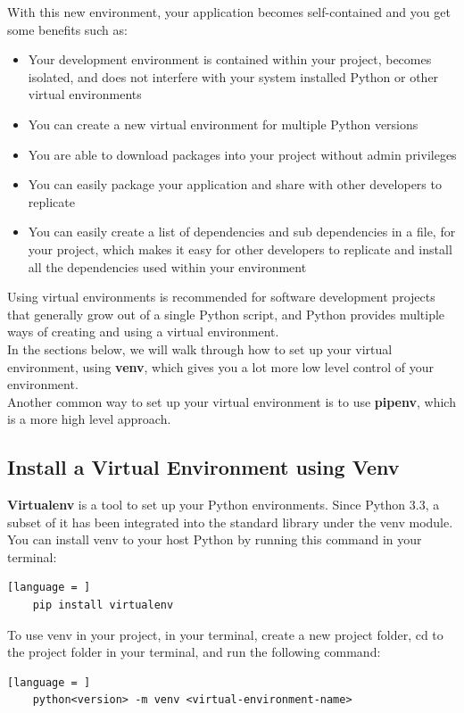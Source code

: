 \documentclass[12pt]{article}
\begin{document}
With this new environment, your application becomes self-contained and you get some benefits such as:
\begin{itemize}
    \item Your development environment is contained within your project, becomes isolated, and does not interfere with your system installed Python or other virtual environments
    \item You can create a new virtual environment for multiple Python versions
    \item You are able to download packages into your project without admin privileges
    \item You can easily package your application and share with other developers to replicate
    \item You can easily create a list of dependencies and sub dependencies in a file, for your project, which makes it easy for other developers to replicate and install all the dependencies used within your environment
\end{itemize}
Using virtual environments is recommended for software development projects that generally grow out of a single Python script, and Python provides multiple ways of creating and using a virtual environment.\\

In the sections below, we will walk through how to set up your virtual environment, using \textbf{venv}, which gives you a lot more low level control of your environment.\\

Another common way to set up your virtual environment is to use \textbf{pipenv}, which is a more high level approach.\\

\subsection{Install a Virtual Environment using Venv}
\textbf{Virtualenv} is a tool to set up your Python environments. Since Python 3.3, a subset of it has been integrated into the standard library under the venv module. You can install venv to your host Python by running this command in your terminal:\\
\begin{lstlisting}[language = ]
    pip install virtualenv
\end{lstlisting}


To use venv in your project, in your terminal, create a new project folder, cd to the project folder in your terminal, and run the following command:
\begin{lstlisting}[language = ]
    python<version> -m venv <virtual-environment-name>
\end{lstlisting}
\end{document}
